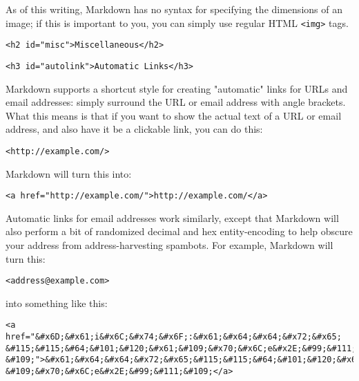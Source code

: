 As of this writing, Markdown has no syntax for specifying the
dimensions of an image; if this is important to you, you can simply
use regular HTML \texttt{<img>} tags.

\noindent\makebox[\linewidth]{\rule{\linewidth}{0.4pt}}


\begin{lstlisting}<h2 id="misc">Miscellaneous</h2>\end{lstlisting}


\begin{lstlisting}<h3 id="autolink">Automatic Links</h3>\end{lstlisting}




Markdown supports a shortcut style for creating "automatic" links for URLs and email addresses: simply surround the URL or email address with angle brackets. What this means is that if you want to show the actual text of a URL or email address, and also have it be a clickable link, you can do this:

\begin{lstlisting}
<http://example.com/>
\end{lstlisting}




Markdown will turn this into:

\begin{lstlisting}
<a href="http://example.com/">http://example.com/</a>
\end{lstlisting}




Automatic links for email addresses work similarly, except that
Markdown will also perform a bit of randomized decimal and hex
entity-encoding to help obscure your address from address-harvesting
spambots. For example, Markdown will turn this:

\begin{lstlisting}
<address@example.com>
\end{lstlisting}




into something like this:

\begin{lstlisting}
<a href="&#x6D;&#x61;i&#x6C;&#x74;&#x6F;:&#x61;&#x64;&#x64;&#x72;&#x65;
&#115;&#115;&#64;&#101;&#120;&#x61;&#109;&#x70;&#x6C;e&#x2E;&#99;&#111;
&#109;">&#x61;&#x64;&#x64;&#x72;&#x65;&#115;&#115;&#64;&#101;&#120;&#x61;
&#109;&#x70;&#x6C;e&#x2E;&#99;&#111;&#109;</a>
\end{lstlisting}





